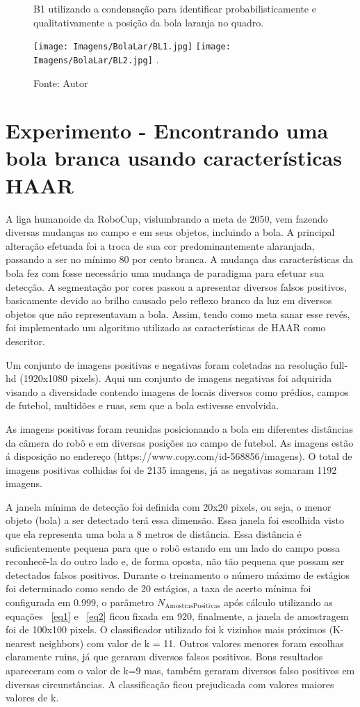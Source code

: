 \begin{figure}[!ht]
\centering \caption{B1 utilizando a condensação para identificar probabilisticamente e qualitativamente a posição da bola laranja no quadro.}
\texttt{[image: Imagens/BolaLar/BL1.jpg]}
\texttt{[image: Imagens/BolaLar/BL2.jpg]}
\DeclareGraphicsExtensions.
\caption*{Fonte: Autor}
\label{Fig:CondBall}
\end{figure}




\section{Experimento - Encontrando uma bola branca usando características HAAR}
\label{exp:bolbra}
A liga humanoide da RoboCup, vislumbrando a meta de 2050, vem fazendo diversas mudanças no campo e em seus objetos, incluindo a bola. A principal alteração efetuada foi a troca de sua cor predominantemente alaranjada, passando a ser no mínimo 80 por cento branca. A mudança das características da bola fez com fosse necessário uma mudança de paradigma para efetuar sua detecção. A segmentação por cores passou a apresentar diversos falsos positivos, basicamente devido ao brilho causado pelo reflexo branco da luz em diversos objetos que não representavam a bola. Assim, tendo como meta sanar esse revés, foi implementado um algoritmo utilizado as características de HAAR como descritor.

Um conjunto de imagens positivas e negativas foram coletadas na resolução full-hd (1920x1080 pixels). Aqui um conjunto de imagens negativas foi adquirida visando a diversidade contendo imagens de locais diversos como prédios, campos de futebol, multidões e ruas, sem que a bola estivesse envolvida.

As imagens positivas foram reunidas posicionando a bola em diferentes distâncias da câmera do robô e em diversas posições no campo de futebol.
As imagens estão á disposição no endereço (https://www.copy.com/id-568856/imagens). O total de imagens positivas colhidas foi de 2135 imagens, já as negativas somaram 1192 imagens. 

A janela mínima de detecção foi definida com 20x20 pixels, ou seja, o menor objeto (bola) a ser detectado terá essa dimensão. Essa janela foi escolhida visto que ela representa uma bola a 8 metros de distância. Essa distância é suficientemente pequena para que o robô estando em um lado do campo possa reconhecê-la do outro lado e, de forma oposta, não tão pequena que possam ser detectados falsos positivos. Durante o treinamento o número máximo de estágios foi determinado como sendo de 20 estágios, a taxa de acerto mínima foi configurada em 0.999, o parâmetro \(N_{\text{AmostrasPositivas}}\) após cálculo utilizando as equações ~\ref{eq1} e ~\ref{eq2} ficou fixada em 920, finalmente, a janela de amostragem foi de 100x100 pixels. O classificador utilizado foi k vizinhos mais próximos (K-nearest neighbors) com valor de k = 11. Outros valores menores foram escolhas claramente ruins, já que geraram diversos falsos positivos. Bons resultados apareceram com o valor de k=9 mas, também geraram diversos falso positivos em diversas circunstâncias. A classificação ficou prejudicada com valores maiores valores de k.

